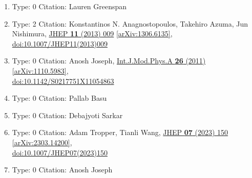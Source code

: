 \documentclass[a4paper,10pt]{article}
\begin{document}
\begin{enumerate}
\begin{enumerate}
  \item Type: 0 Citation: Lauren Greenspan
  \item Type: 2 Citation: Konstantinos N. Anagnostopoulos, Takehiro Azuma, Jun Nishimura, \href{https://www.doi.org/10.1007/JHEP11(2013)009}{JHEP {\bf 11} (2013) 009}  \href{https://arxiv.org/abs/1306.6135}{[arXiv:1306.6135]},\\\href{https://www.doi.org/10.1007/JHEP11(2013)009}{doi:10.1007/JHEP11(2013)009}
  \item Type: 0 Citation: Anosh Joseph, \href{https://www.doi.org/10.1142/S0217751X11054863}{Int.J.Mod.Phys.A {\bf 26} (2011) }  \href{https://arxiv.org/abs/1110.5983}{[arXiv:1110.5983]},\\\href{https://www.doi.org/10.1142/S0217751X11054863}{doi:10.1142/S0217751X11054863}
  \item Type: 0 Citation: Pallab Basu
  \item Type: 0 Citation: Debajyoti Sarkar
  \item Type: 0 Citation: Adam Tropper, Tianli Wang, \href{https://www.doi.org/10.1007/JHEP07(2023)150}{JHEP {\bf 07} (2023) 150}  \href{https://arxiv.org/abs/2303.14200}{[arXiv:2303.14200]},\\\href{https://www.doi.org/10.1007/JHEP07(2023)150}{doi:10.1007/JHEP07(2023)150}
  \item Type: 0 Citation: Anosh Joseph

\end{enumerate}
\end{enumerate}
\end{document}
